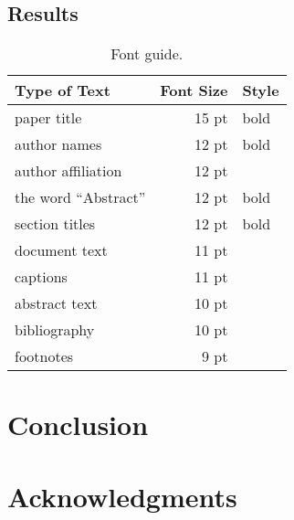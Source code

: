 \documentclass[11pt]{article}
\begin{document}
\subsection{Results}


\begin{table}[h]
\begin{center}
\begin{tabular}{|l|rl|}
\hline \bf Type of Text & \bf Font Size & \bf Style \\ \hline
paper title & 15 pt & bold \\
author names & 12 pt & bold \\
author affiliation & 12 pt & \\
the word ``Abstract'' & 12 pt & bold \\
section titles & 12 pt & bold \\
document text & 11 pt  &\\
captions & 11 pt & \\
abstract text & 10 pt & \\
bibliography & 10 pt & \\
footnotes & 9 pt & \\
\hline
\end{tabular}
\end{center}
\caption{\label{font-table} Font guide. }
\end{table}

\section{Conclusion}


\section*{Acknowledgments}


%
%
\end{document}
